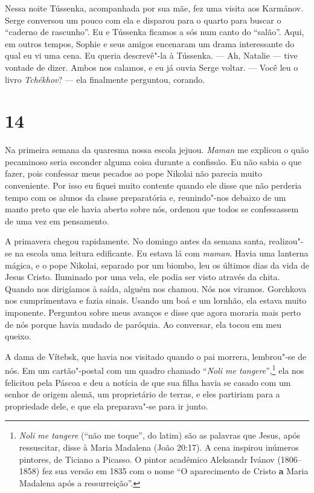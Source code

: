 Nessa noite Tússenka, acompanhada por sua mãe, fez uma visita aos
Karmánov. Serge conversou um pouco com ela e disparou para o quarto para
buscar o ``caderno de rascunho''. Eu e Tússenka ficamos a sós num canto
do ``salão''. Aqui, em outros tempos, Sophie e seus amigos encenaram um
drama interessante do qual eu vi uma cena. Eu queria descrevê"-la à
Tússenka. --- Ah, Natalie --- tive vontade de dizer. Ambos nos calamos,
e eu já ouvia Serge voltar. --- Você leu o livro \emph{Tchékhov}? --- ela
finalmente perguntou, corando.

\section{14}

Na primeira semana da quaresma nossa escola jejuou. \emph{Maman} me
explicou o quão pecaminoso seria esconder alguma coisa durante a
confissão. Eu não sabia o que fazer, pois confessar meus pecados ao pope
Nikolai não parecia muito conveniente. Por isso eu fiquei muito contente
quando ele disse que não perderia tempo com os alunos da classe
preparatória e, reunindo"-nos debaixo de um manto preto que ele havia
aberto sobre nós, ordenou que todos se confessassem de uma vez em
pensamento.

A primavera chegou rapidamente. No domingo antes da semana santa,
realizou"-se na escola uma leitura edificante. Eu estava lá com
\emph{maman}. Havia uma lanterna mágica, e o pope Nikolai, separado por
um biombo, leu os últimos dias da vida de Jesus Cristo. Iluminado por
uma vela, ele podia ser visto através da chita. Quando nos dirigíamos à
saída, alguém nos chamou. Nós nos viramos. Gorchkova nos cumprimentava e
fazia sinais. Usando um boá e um lornhão, ela estava muito imponente.
Perguntou sobre meus avanços e disse que agora moraria mais perto de nós
porque havia mudado de paróquia. Ao conversar, ela tocou em meu queixo.

A dama de Vítebsk, que havia nos visitado quando o pai morrera,
lembrou"-se de nós. Em um cartão"-postal com um quadro chamado
``\emph{Noli me tangere}'',\footnote{\emph{Noli me tangere} (``não me \label{noli}
  toque'', do latim) são as palavras que Jesus, após ressuscitar, disse
  à Maria Madalena (João 20:17). A cena inspirou inúmeros pintores, de
  Ticiano a Picasso. O pintor acadêmico Aleksandr Ivánov (1806--1858) fez
  sua versão em 1835 com o nome ``O aparecimento de Cristo \textbf{a}
  Maria Madalena após a ressurreição''.} ela nos felicitou pela Páscoa e
deu a notícia de que sua filha havia se casado com um senhor de origem
alemã, um proprietário de terras, e eles partiriam para a propriedade
dele, e que ela preparava"-se para ir junto.

